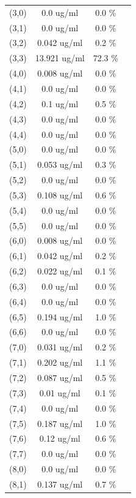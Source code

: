 \documentclass{article}
\begin{document}
\begin{tabular}{c c c c}
(3,0)&        0.0 ug/ml        &0.0 \%\\
(3,1)&        0.0 ug/ml        &0.0 \%\\
(3,2)&        0.042 ug/ml        &0.2 \%\\
(3,3)&        13.921 ug/ml        &72.3 \%\\
(4,0)&        0.008 ug/ml        &0.0 \%\\
(4,1)&        0.0 ug/ml        &0.0 \%\\
(4,2)&        0.1 ug/ml        &0.5 \%\\
(4,3)&        0.0 ug/ml        &0.0 \%\\
(4,4)&        0.0 ug/ml        &0.0 \%\\
(5,0)&        0.0 ug/ml        &0.0 \%\\
(5,1)&        0.053 ug/ml        &0.3 \%\\
(5,2)&        0.0 ug/ml        &0.0 \%\\
(5,3)&        0.108 ug/ml        &0.6 \%\\
(5,4)&        0.0 ug/ml        &0.0 \%\\
(5,5)&        0.0 ug/ml        &0.0 \%\\
(6,0)&        0.008 ug/ml        &0.0 \%\\
(6,1)&        0.042 ug/ml        &0.2 \%\\
(6,2)&        0.022 ug/ml        &0.1 \%\\
(6,3)&        0.0 ug/ml        &0.0 \%\\
(6,4)&        0.0 ug/ml        &0.0 \%\\
(6,5)&        0.194 ug/ml        &1.0 \%\\
(6,6)&        0.0 ug/ml        &0.0 \%\\
(7,0)&        0.031 ug/ml        &0.2 \%\\
(7,1)&        0.202 ug/ml        &1.1 \%\\
(7,2)&        0.087 ug/ml        &0.5 \%\\
(7,3)&        0.01 ug/ml        &0.1 \%\\
(7,4)&        0.0 ug/ml        &0.0 \%\\
(7,5)&        0.187 ug/ml        &1.0 \%\\
(7,6)&        0.12 ug/ml        &0.6 \%\\
(7,7)&        0.0 ug/ml        &0.0 \%\\
(8,0)&        0.0 ug/ml        &0.0 \%\\
(8,1)&        0.137 ug/ml        &0.7 \%\\

\end{tabular}
\end{document}

